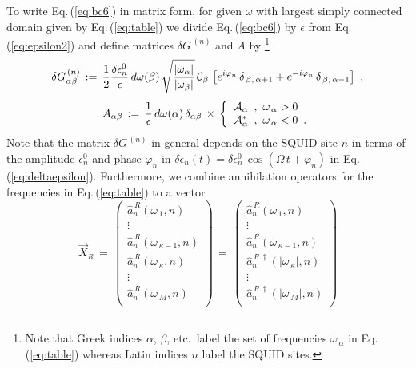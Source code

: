 To write Eq.\,(\ref{eq:bc6}) in matrix form, for given $\omega$ with largest simply connected 
domain given by Eq.\,(\ref{eq:table})  
we divide Eq.\,(\ref{eq:bc6}) by $\epsilon$ 
from Eq.\,(\ref{eq:epsilon2}) and define matrices $\delta G^{\,(n)}$ and $A$ by
%
\footnote{Note that Greek indices $\alpha$, $\beta$, etc.~label the set of frequencies 
$\omega_{\,\alpha}$ in Eq.\,(\ref{eq:table}) whereas Latin indices $n$ label the SQUID sites.}
%
\begin{equation} \label{eq:matrix_gtilde}
\delta G_{\alpha \beta}^{\,(n)} \, := \, \frac{1}{2} \frac{\delta \epsilon_n^0}{\epsilon} \, 
d\omega(\beta) \,
\sqrt{\frac{|\omega_{\alpha}|}{|\omega_{\beta}|}} \, {\cal C}_{\beta} \,
\left[e^{i \varphi_n} \, \delta_{\,\beta,\,\alpha+1} + e^{- i \varphi_n} \, \delta_{\,\beta,\,\alpha-1} \right] \, \, ,
\end{equation}
%
\begin{equation} \label{eq:matrix_a}
A_{\alpha \beta} \, := \, \frac{1}{\epsilon} \, d\omega(\alpha) \, \delta_{\alpha \beta} \, \times \,
\left\{
\begin{array}{l}
{\cal{A}}_{\alpha} \, \, \, , \, \, \omega_{\,\alpha}>0  \\
{\cal{A}}_{\alpha}^* \, \, \, , \, \, \omega_{\,\alpha}<0 \, \, \, .
\end{array} \right.
\end{equation}
%
Note that the matrix $\delta G^{\,(n)}$ in general depends on the SQUID site $n$ in terms
of the amplitude $\epsilon_n^0$ and phase $\varphi_n$ in 
$\delta \epsilon_n(t) = \delta \epsilon_n^0 \, \cos(\Omega \, t + \varphi_n)$
in Eq.\,(\ref{eq:deltaepsilon}).
%
Furthermore, we combine annihilation operators for the frequencies in Eq.\,(\ref{eq:table}) to a vector
%
\begin{equation} \label{eq:vector_x}
\vec{X}_R \, = \, 
\begin{pmatrix}
\hat{a}_n^{\,R}(\omega_{\,1},n) \\
\vdots \\
\hat{a}_n^{\,R}(\omega_{\,\kappa-1},n) \\
\hat{a}_n^{\,R}(\omega_{\,\kappa},n) \\
\vdots \\
\hat{a}_n^{\,R}(\omega_{\,M},n) \\
\end{pmatrix}
\, = \,
\begin{pmatrix}
\hat{a}_n^{\,R}(\omega_{\,1},n) \\
\vdots \\
\hat{a}_n^{\,R}(\omega_{\,\kappa-1},n) \\
\hat{a}_n^{\,R\,\dagger}(|\omega_{\,\kappa}|,n) \\
\vdots \\
\hat{a}_n^{\,R\,\dagger}(|\omega_{\,M}|,n) \\
\end{pmatrix}
\end{equation}
